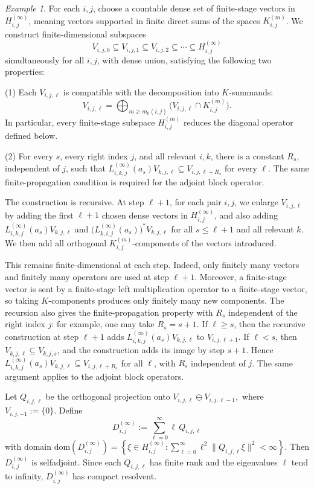 \documentclass[11pt]{amsart}
\theoremstyle{definition}
\theoremstyle{remark}
\newtheorem{example}[theorem]{Example}
\newcommand{\dom}{\mathrm{dom}}
\begin{document}
\begin{example}
For each $i,j$, choose a countable dense set of finite-stage vectors in
$H_{i,j}^{(\infty)}$, meaning vectors supported in finite direct sums of the
spaces $K_{i,j}^{(m)}$. We construct finite-dimensional subspaces
\[
V_{i,j,0}\subseteq V_{i,j,1}\subseteq V_{i,j,2}\subseteq\cdots
\subseteq H_{i,j}^{(\infty)}
\]
simultaneously for all $i,j$, with dense union, satisfying the following two
properties:
\smallskip

\noindent
 (1) Each $V_{i,j,\ell}$ is compatible with the decomposition into
$K$-summands:
\[
V_{i,j,\ell}
=
\bigoplus_{m\geq m_0(i,j)}
\bigl(V_{i,j,\ell}\cap K_{i,j}^{(m)}\bigr).
\]
In particular, every finite-stage subspace $H_{i,j}^{(m)}$ reduces the
diagonal operator defined below.
\smallskip

\noindent
 (2) For every $s$, every right index $j$, and all relevant $i,k$,
there is a constant $R_s$, independent of $j$, such that $L_{i,k,j}^{(\infty)}(a_s)V_{k,j,\ell}\subseteq V_{i,j,\ell+R_s}$
for every $\ell$. The same finite-propagation condition is required for the
adjoint block operator.

The construction is recursive. At step $\ell+1$, for each pair $i,j$, we
enlarge $V_{i,j,\ell}$ by adding the first $\ell+1$ chosen dense vectors in
$H_{i,j}^{(\infty)}$, and also adding $L_{i,k,j}^{(\infty)}(a_s)V_{k,j,\ell}$
and $\bigl(L_{k,i,j}^{(\infty)}(a_s)\bigr)^*V_{k,j,\ell}$
for all $s\leq \ell+1$ and all relevant $k$. We then add all orthogonal
$K_{i,j}^{(m)}$-components of the vectors introduced.

This remains finite-dimensional at each step. Indeed, only finitely many
vectors and finitely many operators are used at step $\ell+1$. Moreover, a
finite-stage vector is sent by a finite-stage left multiplication operator to a
finite-stage vector, so taking $K$-components produces only finitely many new
components. The recursion also gives the finite-propagation property with
$R_s$ independent of the right index $j$: for example, one may take
$R_s=s+1$. If $\ell\geq s$, then the recursive construction at step
$\ell+1$ adds $L_{i,k,j}^{(\infty)}(a_s)V_{k,j,\ell}$
to $V_{i,j,\ell+1}$. If $\ell<s$, then
$V_{k,j,\ell}\subseteq V_{k,j,s}$, and the construction adds its image by
step $s+1$. Hence $L_{i,k,j}^{(\infty)}(a_s)V_{k,j,\ell}\subseteq V_{i,j,\ell+R_s}$
for all $\ell$, with $R_s$ independent of $j$. The same argument applies
to the adjoint block operators.

Let $Q_{i,j,\ell}$
be the orthogonal projection onto $V_{i,j,\ell}\ominus V_{i,j,\ell-1},$ where $V_{i,j,-1}:=\{0\}.$ Define
\[
D_{i,j}^{(\infty)}
:=
\sum_{\ell=0}^{\infty}\ell\, Q_{i,j,\ell}
\]
with domain $\dom(D_{i,j}^{(\infty)})=\left\{
\xi\in H_{i,j}^{(\infty)}:
\sum_{\ell=0}^{\infty}\ell^2\|Q_{i,j,\ell}\xi\|^2<\infty
\right\}.$
Then $D_{i,j}^{(\infty)}$ is selfadjoint. Since each $Q_{i,j,\ell}$ has
finite rank and the eigenvalues $\ell$ tend to infinity,
$D_{i,j}^{(\infty)}$ has compact resolvent. 


\end{example}
\end{document}

